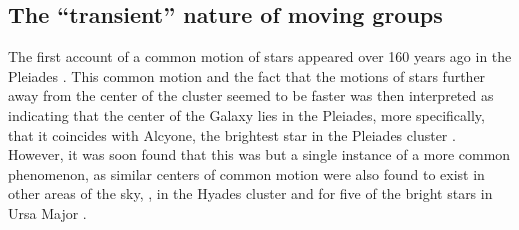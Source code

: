 \subsection{The ``transient'' nature of moving groups}

The first account of a common motion of stars appeared over 160 years
ago in the Pleiades \citep{1846AN.....24..213M}. This common motion
and the fact that the motions of stars further away from the center of
the cluster seemed to be faster was then interpreted as indicating
that the center of the Galaxy lies in the Pleiades, more specifically,
that it coincides with Alcyone, the brightest star in the Pleiades
cluster \citep{madler47}. However, it was soon found that this was but
a single instance of a more common phenomenon, as similar centers of
common motion were also found to exist in other areas of the sky, \ie,
in the Hyades cluster and for five of the bright stars in Ursa Major
\citep{proctor69a}.


